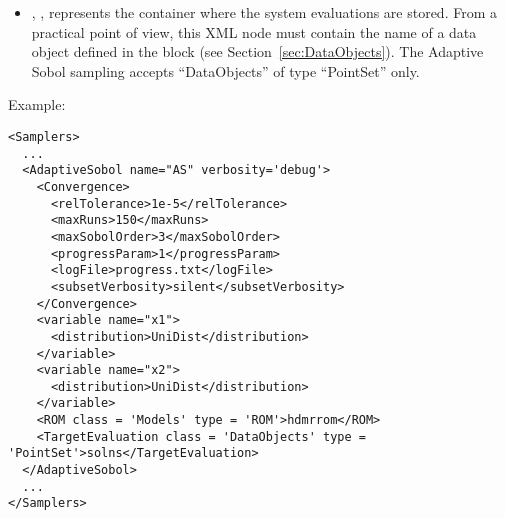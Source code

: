         \begin{itemize}
      \item {}, ,
        represents the container where the system evaluations are stored.
        From a practical point of view, this XML node must contain the name of
        a data object defined in the  block (see
        Section~\ref{sec:DataObjects}).
        The Adaptive Sobol sampling accepts ``DataObjects'' of type
        ``PointSet'' only.
\end{itemize}

Example:
\begin{lstlisting}[style=XML,morekeywords={class,limit,subGridTol,weight,persistence}]
<Samplers>
  ...
  <AdaptiveSobol name="AS" verbosity='debug'>
    <Convergence>
      <relTolerance>1e-5</relTolerance>
      <maxRuns>150</maxRuns>
      <maxSobolOrder>3</maxSobolOrder>
      <progressParam>1</progressParam>
      <logFile>progress.txt</logFile>
      <subsetVerbosity>silent</subsetVerbosity>
    </Convergence>
    <variable name="x1">
      <distribution>UniDist</distribution>
    </variable>
    <variable name="x2">
      <distribution>UniDist</distribution>
    </variable>
    <ROM class = 'Models' type = 'ROM'>hdmrrom</ROM>
    <TargetEvaluation class = 'DataObjects' type = 'PointSet'>solns</TargetEvaluation>
  </AdaptiveSobol>
  ...
</Samplers>
\end{lstlisting}

